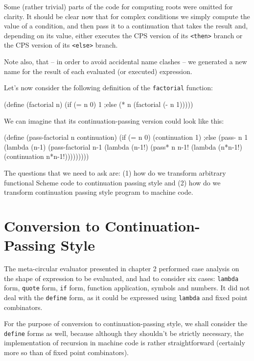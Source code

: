 Some (rather trivial) parts of the code for computing roots were
omitted for clarity. It should be clear now that for complex conditions
we simply compute the value of a condition, and then pass it to
a continuation that takes the result and, depending on its value,
either executes the CPS version of its \texttt{<then>} branch or
the CPS version of its \texttt{<else>} branch.

Note also, that -- in order to avoid accidental name clashes --
we generated a new name for the result of each evaluated (or executed)
expression.

Let's now consider the following definition of the \texttt{factorial}
function:
\begin{Snippet}
  (define (factorial n)
    (if (= n 0)
        1
    ;else
        (* n (factorial (- n 1)))))
\end{Snippet}

We can imagine that its continuation-passing version could
look like this:

\begin{Snippet}
  (define (pass-factorial n continuation)
    (if (= n 0)
      (continuation 1)
    ;else
      (pass- n 1
        (lambda (n-1)
          (pass-factorial n-1
            (lambda (n-1!)
              (pass* n n-1!
                (lambda (n*n-1!)
                  (continuation n*n-1!)))))))))
\end{Snippet}

The questions that we need to ask are: (1) how do we transform
arbitrary functional Scheme code to continuation passing style
and (2) how do we transform continuation passing style program
to machine code.

\section{Conversion to Continuation-Passing Style}

The meta-circular evaluator presented in chapter 2 performed
case analysis on the shape of expression to be evaluated,
and had to consider six cases: \texttt{lambda} form, \texttt{quote}
form, \texttt{if} form, function application, symbols and
numbers. It did not deal with the \texttt{define} form, as
it could be expressed using \texttt{lambda} and fixed point
combinators.

For the purpose of conversion to continuation-passing style,
we shall consider the \texttt{define} forms as well, because
although they shouldn't be strictly necessary, the implementation
of recursion in machine code is rather straightforward (certainly
more so than of fixed point combinators).

